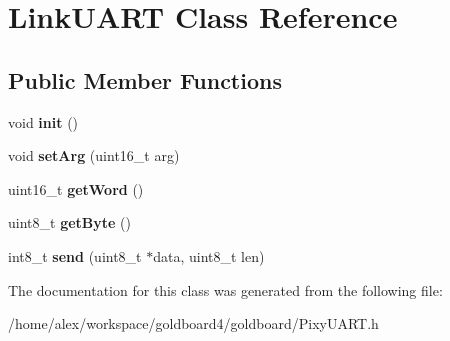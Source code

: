 \hypertarget{class_link_u_a_r_t}{}\section{Link\+U\+A\+RT Class Reference}
\label{class_link_u_a_r_t}
\subsection*{Public Member Functions}
\begin{DoxyCompactItemize}
\item 
void {\bfseries init} ()\hypertarget{class_link_u_a_r_t_a01a9c561421f4ddb04f329219eb2e100}{}\label{class_link_u_a_r_t_a01a9c561421f4ddb04f329219eb2e100}

\item 
void {\bfseries set\+Arg} (uint16\+\_\+t arg)\hypertarget{class_link_u_a_r_t_a26a7fe9330f846de273637517a0f092c}{}\label{class_link_u_a_r_t_a26a7fe9330f846de273637517a0f092c}

\item 
uint16\+\_\+t {\bfseries get\+Word} ()\hypertarget{class_link_u_a_r_t_af8d40edd838c32f455cd64a9399e1279}{}\label{class_link_u_a_r_t_af8d40edd838c32f455cd64a9399e1279}

\item 
uint8\+\_\+t {\bfseries get\+Byte} ()\hypertarget{class_link_u_a_r_t_aeead28b04db5dd81516af99125b74f30}{}\label{class_link_u_a_r_t_aeead28b04db5dd81516af99125b74f30}

\item 
int8\+\_\+t {\bfseries send} (uint8\+\_\+t $\ast$data, uint8\+\_\+t len)\hypertarget{class_link_u_a_r_t_ae39f94886b5656fcd391be7e3d26f6b5}{}\label{class_link_u_a_r_t_ae39f94886b5656fcd391be7e3d26f6b5}

\end{DoxyCompactItemize}


The documentation for this class was generated from the following file\+:\begin{DoxyCompactItemize}
\item 
/home/alex/workspace/goldboard4/goldboard/Pixy\+U\+A\+R\+T.\+h\end{DoxyCompactItemize}
